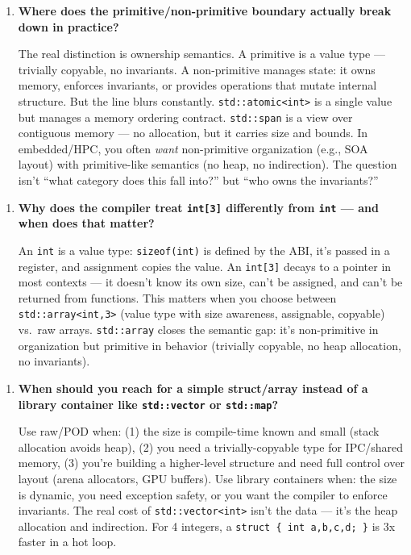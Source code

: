 \begin{enumerate}
\item \textbf{Where does the primitive/non-primitive boundary actually break down in practice?}

The real distinction is ownership semantics. A primitive is a value type --- trivially copyable, no invariants. A non-primitive manages state: it owns memory, enforces invariants, or provides operations that mutate internal structure. But the line blurs constantly. \texttt{std::atomic<int>} is a single value but manages a memory ordering contract. \texttt{std::span} is a view over contiguous memory --- no allocation, but it carries size and bounds. In embedded/HPC, you often \emph{want} non-primitive organization (e.g., SOA layout) with primitive-like semantics (no heap, no indirection). The question isn't ``what category does this fall into?'' but ``who owns the invariants?''
\end{enumerate}

\begin{enumerate}
\item \textbf{Why does the compiler treat \texttt{int[3]} differently from \texttt{int} --- and when does that matter?}

An \texttt{int} is a value type: \texttt{sizeof(int)} is defined by the ABI, it's passed in a register, and assignment copies the value. An \texttt{int[3]} decays to a pointer in most contexts --- it doesn't know its own size, can't be assigned, and can't be returned from functions. This matters when you choose between \texttt{std::array<int,3>} (value type with size awareness, assignable, copyable) vs.\ raw arrays. \texttt{std::array} closes the semantic gap: it's non-primitive in organization but primitive in behavior (trivially copyable, no heap allocation, no invariants).
\end{enumerate}

\begin{enumerate}
\item \textbf{When should you reach for a simple struct/array instead of a library container like \texttt{std::vector} or \texttt{std::map}?}

Use raw/POD when: (1) the size is compile-time known and small (stack allocation avoids heap), (2) you need a trivially-copyable type for IPC/shared memory, (3) you're building a higher-level structure and need full control over layout (arena allocators, GPU buffers). Use library containers when: the size is dynamic, you need exception safety, or you want the compiler to enforce invariants. The real cost of \texttt{std::vector<int>} isn't the data --- it's the heap allocation and indirection. For 4 integers, a \texttt{struct \{ int a,b,c,d; \}} is 3x faster in a hot loop.
\end{enumerate}

